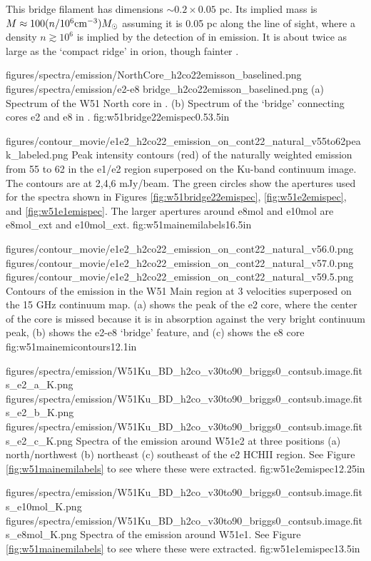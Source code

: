 This bridge filament has dimensions $\sim0.2\times0.05$ pc.  Its implied mass
is $M\approx100 (n/10^6 \textrm{cm}^{-3}) M_{\odot}$ assuming it is 0.05 pc along the line of
sight, where a density $n\gtrsim10^6$ is implied by the detection of
\formaldehyde \twotwo in emission.  It is about twice as large as the `compact
ridge' in orion, though fainter \citep{Mangum1990a,Mangum1993b}.

\FigureTwo
{{figures/spectra/emission/NorthCore_h2co22emisson_baselined}.png}
{{figures/spectra/emission/e2-e8 bridge_h2co22emisson_baselined}.png}
{(a) Spectrum of the W51 North core in \ortho \twotwo.
(b) Spectrum of the `bridge' connecting cores e2 and e8 in \ortho \twotwo.
}
{fig:w51bridge22emispec}{0.5}{3.5in}

\Figure
{figures/contour_movie/e1e2_h2co22_emission_on_cont22_natural_v55to62peak_labeled.png}
{ Peak intensity contours (red) of the naturally weighted \formaldehyde \twotwo
emission from 55 to 62 \kms in the e1/e2 region superposed on the Ku-band
continuum image.  The contours are at 2,4,6 mJy/beam.  The green circles show
the apertures used for the spectra shown in Figures
\ref{fig:w51bridge22emispec}, \ref{fig:w51e2emispec}, and
\ref{fig:w51e1emispec}.  The larger apertures around e8mol and e10mol are
e8mol\_ext and e10mol\_ext.
}{fig:w51mainemilabels}{1}{6.5in}

\FigureThreeAA
{figures/contour_movie/e1e2_h2co22_emission_on_cont22_natural_v56.0.png}
{figures/contour_movie/e1e2_h2co22_emission_on_cont22_natural_v57.0.png}
{figures/contour_movie/e1e2_h2co22_emission_on_cont22_natural_v59.5.png}
{Contours of the \formaldehyde \twotwo emission in the W51 Main region at 3
velocities superposed on the 15 GHz continuum map.  (a) shows the peak of the e2
core, where the center of the core is missed because it is in absorption
against the very bright continuum peak, (b) shows the e2-e8 `bridge' feature,
and (c) shows the e8 core}
{fig:w51mainemicontours}{1}{2.1in}

\FigureThreeAA
{figures/spectra/emission/W51Ku_BD_h2co_v30to90_briggs0_contsub.image.fits_e2_a_K.png}
{figures/spectra/emission/W51Ku_BD_h2co_v30to90_briggs0_contsub.image.fits_e2_b_K.png}
{figures/spectra/emission/W51Ku_BD_h2co_v30to90_briggs0_contsub.image.fits_e2_c_K.png}
{Spectra of the \twotwo emission around W51e2 at three positions (a)
north/northwest (b) northeast (c) southeast of the e2 HCHII region.  See Figure
\ref{fig:w51mainemilabels} to see where these were extracted.}
{fig:w51e2emispec}{1}{2.25in}

\FigureTwoAA
{figures/spectra/emission/W51Ku_BD_h2co_v30to90_briggs0_contsub.image.fits_e10mol_K.png}
{figures/spectra/emission/W51Ku_BD_h2co_v30to90_briggs0_contsub.image.fits_e8mol_K.png}
{Spectra of the \twotwo emission around W51e1.  See Figure
\ref{fig:w51mainemilabels} to see where these were extracted.
}
{fig:w51e1emispec}{1}{3.5in}


